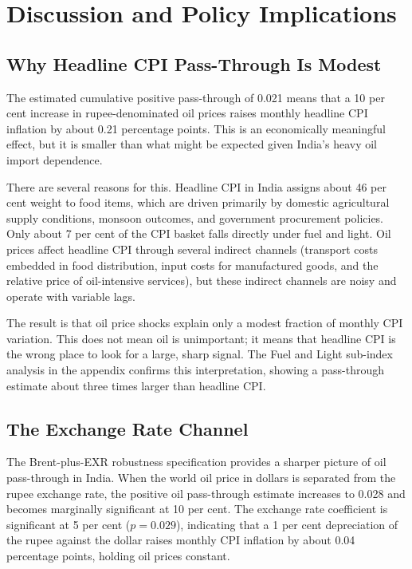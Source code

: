 \chapter{Discussion and Policy Implications}
\label{ch:discussion}

\section{Why Headline CPI Pass-Through Is Modest}

The estimated cumulative positive pass-through of 0.021 means that a 10 per cent increase in rupee-denominated oil prices raises monthly headline CPI inflation by about 0.21 percentage points. This is an economically meaningful effect, but it is smaller than what might be expected given India's heavy oil import dependence.

There are several reasons for this. Headline CPI in India assigns about 46 per cent weight to food items, which are driven primarily by domestic agricultural supply conditions, monsoon outcomes, and government procurement policies. Only about 7 per cent of the CPI basket falls directly under fuel and light. Oil prices affect headline CPI through several indirect channels (transport costs embedded in food distribution, input costs for manufactured goods, and the relative price of oil-intensive services), but these indirect channels are noisy and operate with variable lags.

The result is that oil price shocks explain only a modest fraction of monthly CPI variation. This does not mean oil is unimportant; it means that headline CPI is the wrong place to look for a large, sharp signal. The Fuel and Light sub-index analysis in the appendix confirms this interpretation, showing a pass-through estimate about three times larger than headline CPI.

\section{The Exchange Rate Channel}

The Brent-plus-EXR robustness specification provides a sharper picture of oil pass-through in India. When the world oil price in dollars is separated from the rupee exchange rate, the positive oil pass-through estimate increases to 0.028 and becomes marginally significant at 10 per cent. The exchange rate coefficient is significant at 5 per cent ($p = 0.029$), indicating that a 1 per cent depreciation of the rupee against the dollar raises monthly CPI inflation by about 0.04 percentage points, holding oil prices constant.

